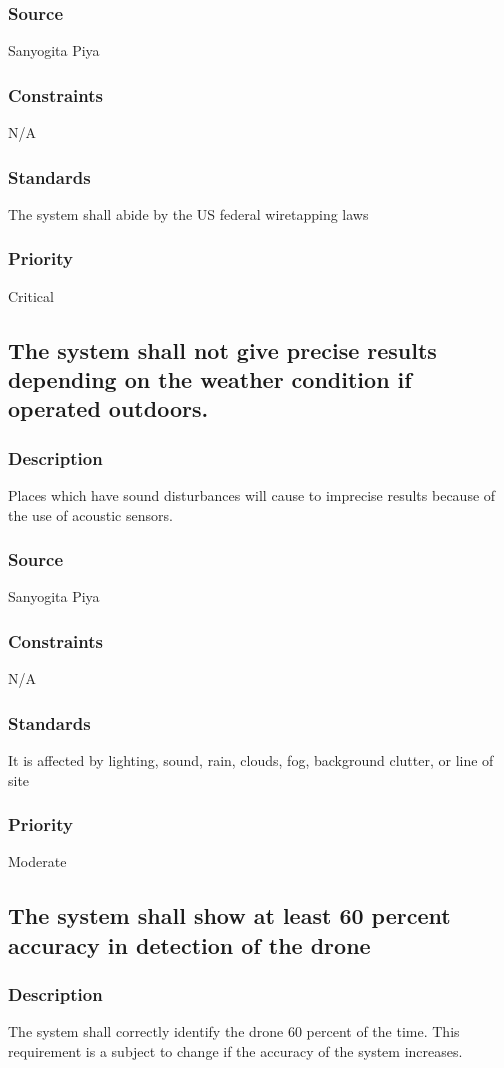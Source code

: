 \subsubsection{Source}
Sanyogita Piya
\subsubsection{Constraints}
N/A
\subsubsection{Standards}
The system shall abide by the US federal wiretapping laws
\subsubsection{Priority}
Critical

\subsection{The system shall not give precise results depending on the weather condition if operated outdoors.}
\subsubsection{Description}
Places which have sound disturbances will cause to imprecise results because of the use of acoustic sensors.
\subsubsection{Source}
Sanyogita Piya
\subsubsection{Constraints}
N/A
\subsubsection{Standards}
It is affected by lighting, sound, rain, clouds, fog, background clutter, or line of site
\subsubsection{Priority}
Moderate

\subsection{The system shall show at least 60 percent accuracy in detection of the drone}
\subsubsection{Description}
The system shall correctly identify the drone 60 percent of the time. This requirement is a subject to change if the accuracy of the system increases.
